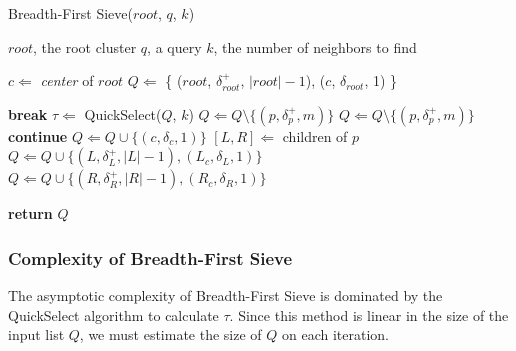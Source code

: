 \begin{algorithm} %
    \caption{Breadth-First Sieve($root$, $q$, $k$)} %
    \label{alg:methods:bredth-first-sieve} %
    \begin{algorithmic} %
        \REQUIRE $root$, the root cluster
        \REQUIRE $q$, a query
        \REQUIRE $k$, the number of neighbors to find

        \STATE $c \Leftarrow$ \emph{center} of $root$
        \STATE $Q \Leftarrow$ \{ ($root$, $\delta^{+}_{root}$, $|root| - 1$), ($c$, $\delta_{root}$, 1) \}

        \ALOOP{}
                \STATE \textbf{break}
            \ENDIF
            \STATE $\tau \Leftarrow$ QuickSelect($Q$, $k$)
                    \STATE $Q \Leftarrow Q \setminus \{ (p, \delta^{+}_{p}, m) \}$
                \ENDIF
            \ENDFOR
                \STATE $Q \Leftarrow Q \setminus \{ (p, \delta^{+}_{p}, m) \}$
                    \STATE \textbf{continue}
                        \STATE $Q \Leftarrow Q \cup \{ (c, \delta_{c}, 1) \}$
                    \ENDFOR
                \ELSE
                    \STATE $[L, R] \Leftarrow$ children of $p$
                    \STATE $Q \Leftarrow Q \cup \{ (L, \delta^{+}_{L}, |L| - 1), (L_c, \delta_{L}, 1) \}$
                    \STATE $Q \Leftarrow Q \cup \{ (R, \delta^{+}_{R}, |R| - 1), (R_c, \delta_{R}, 1) \}$
                \ENDIF
            \ENDFOR
        \ENDALOOP

        \STATE \textbf{return} $Q$
    \end{algorithmic}
\end{algorithm}


\subsubsection{Complexity of Breadth-First Sieve}
\label{sec:methods:knn-search:complexity-of-breadth-first-sieve}

The asymptotic complexity of Breadth-First Sieve is dominated by the QuickSelect algorithm to calculate $\tau$.
Since this method is linear in the size of the input list $Q$, we must estimate the size of $Q$ on each iteration. 

